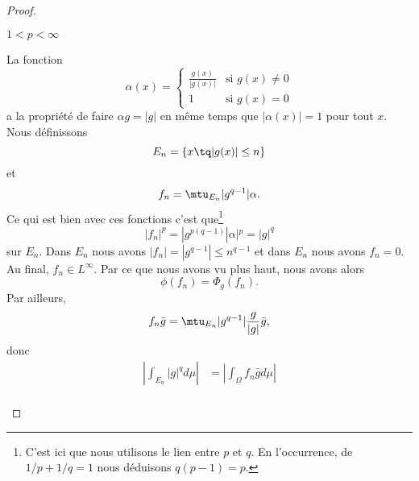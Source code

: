 \begin{proof}
\begin{subproof}
        \item[\( 1<p<\infty\)]

            La fonction
            \begin{equation}
                \alpha(x)=\begin{cases}
                    \frac{ g(x) }{ | g(x) | }    &   \text{si } g(x)\neq 0\\
                    1    &    \text{si } g(x)=0
                \end{cases}
            \end{equation}
            a la propriété de faire \( \alpha g=| g |\) en même temps que \( | \alpha(x) |=1\) pour tout \( x\). Nous définissons
            \begin{equation}
                E_n=\{ x\tq | g(x) |\leq n \}
            \end{equation}
            et
            \begin{equation}
                f_n=\mtu_{E_n}| g^{q-1} |\alpha.
            \end{equation}
            Ce qui est bien avec ces fonctions c'est que\footnote{C'est ici que nous utilisons le lien entre $p$ et $q$. En l'occurrence, de $1/p+1/q=1$ nous déduisons $q(p-1)=p$.}
            \begin{equation}
                | f_n |^p=| g^{p(q-1)} | \alpha |^p=| g |^q
            \end{equation}
            sur \( E_n\). Dans \( E_n\) nous avons \( | f_n |=| g^{q-1} |\leq n^{q-1}\) et dans \( E_n\) nous avons \( f_n=0\). Au final, \( f_n\in L^{\infty}\). Par ce que nous avons vu plus haut, nous avons alors
            \begin{equation}
                \phi(f_n)=\Phi_g(f_n).
            \end{equation}
            Par ailleurs,
            \begin{equation}
                f_n\bar g=\mtu_{E_n}| g^{q-1} |\frac{ g }{ | g | }\bar g,
            \end{equation}
            donc
            \begin{subequations}
                \begin{align}
                    \left|\int_{E_n}| g |^qd\mu\right|&=|\int_{\Omega}f_n\bar gd\mu|\\

\end{align}
\end{subequations}
\end{subproof}
\end{proof}
